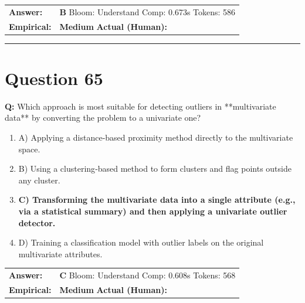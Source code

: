 \documentclass[9pt]{article}
\begin{document}
\begin{tabular}{@{}l p{10.5cm}@{}}
\textbf{Answer:} & \textbf{B} \hspace{1em} Bloom: Understand \hspace{1em} Comp: 0.673s \hspace{1em} Tokens: 586 \\
\textbf{Empirical:} & \textbf{Medium} \hspace{1em} \textbf{Actual (Human):} \underline{\hspace{5cm}}
\end{tabular}

\vspace{0.2cm}
\rule{\textwidth}{0.4pt}
\vspace{0.2cm}


\section*{Question 65}

\textbf{Q:} Which approach is most suitable for detecting outliers in **multivariate data** by converting the problem to a univariate one?

\begin{enumerate}[label=\textbf{\alph{*})}, nosep]
    \item A) Applying a distance‑based proximity method directly to the multivariate space.
    \item B) Using a clustering‑based method to form clusters and flag points outside any cluster.
    \item \textbf{C) Transforming the multivariate data into a single attribute (e.g., via a statistical summary) and then applying a univariate outlier detector.} %
    \item D) Training a classification model with outlier labels on the original multivariate attributes.

\end{enumerate}

\begin{tabular}{@{}l p{10.5cm}@{}}
\textbf{Answer:} & \textbf{C} \hspace{1em} Bloom: Understand \hspace{1em} Comp: 0.608s \hspace{1em} Tokens: 568 \\
\textbf{Empirical:} & \textbf{Medium} \hspace{1em} \textbf{Actual (Human):} \underline{\hspace{5cm}}
\end{tabular}
\end{document}

